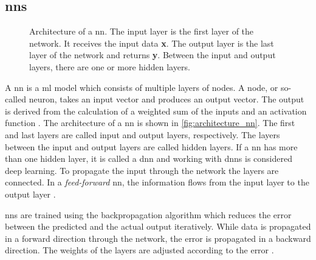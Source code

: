 \subsection{\aclp*{nn}}\label{sec:neural_network}

\begin{figure}[!htb] %
    \centering
    
    \caption[Architecture of a \acs*{nn}]
    {Architecture of a \acs*{nn}. 
    The input layer is the first layer of the network.
    It receives the input data \textbf{x}.
    The output layer is the last layer of the network and returns \textbf{y}.
    Between the input and output layers, there are one or more hidden layers.
    }
    \label{fig:architecture_nn}
\end{figure}

A \ac{nn} is a \ac{ml} model which consists of multiple layers of nodes.
A node, or so-called neuron, takes an input vector and produces an output vector.
The output is derived from the calculation of a weighted sum of the inputs and an activation function \cite{KI2022}.
The architecture of a \ac{nn} is shown in \autoref{fig:architecture_nn}.
The first and last layers are called input and output layers, respectively.
The layers between the input and output layers are called hidden layers.
If a \ac{nn} has more than one hidden layer, it is called a \ac{dnn} and working with \acp{dnn} is considered deep learning.
To propagate the input through the network the layers are connected.
In a \textit{feed-forward} \ac{nn}, the information flows from the input layer to the output layer \cite{seminar_ies}.

\acp{nn} are trained using the backpropagation algorithm which reduces the error between the predicted and the actual output iteratively.
While data is propagated in a forward direction through the network, the error is propagated in a backward direction.
The weights of the layers are adjusted according to the error \cite{KI2022}.
